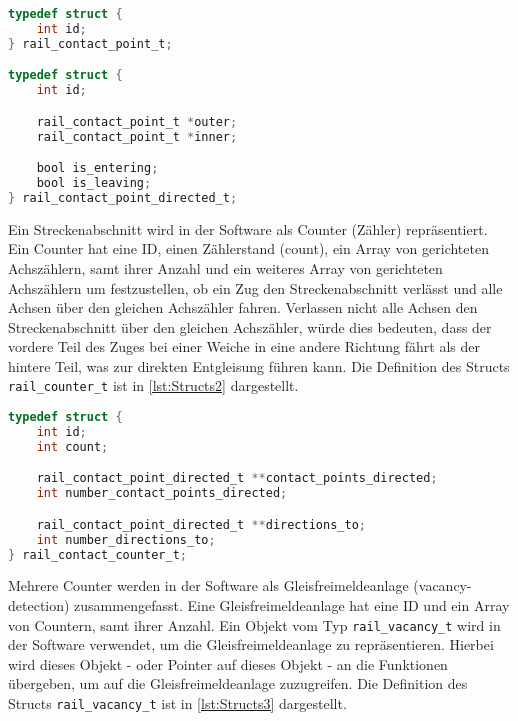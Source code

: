 \begin{margin}
    \begin{lstlisting}[language=C, caption={Definition der Structs}, label={code:Entwicklung-der-GFA:Implementierung-der-Gleisfreimeldeanlage:Achszaehler:Definitionen-der-Structs}]
typedef struct {
    int id;
} rail_contact_point_t;

typedef struct {
    int id;

    rail_contact_point_t *outer;
    rail_contact_point_t *inner;

    bool is_entering;
    bool is_leaving;
} rail_contact_point_directed_t;
    \end{lstlisting}
\end{margin}

Ein Streckenabschnitt wird in der Software als Counter (Zähler) repräsentiert. Ein Counter hat eine ID, einen Zählerstand (count), ein Array von gerichteten Achszählern, samt ihrer Anzahl und ein weiteres Array von gerichteten Achszählern um festzustellen, ob ein Zug den Streckenabschnitt verlässt und alle Achsen über den gleichen Achszähler fahren. Verlassen nicht alle Achsen den Streckenabschnitt über den gleichen Achszähler, würde dies bedeuten, dass der vordere Teil des Zuges bei einer Weiche in eine andere Richtung fährt als der hintere Teil, was zur direkten Entgleisung führen kann. Die Definition des Structs \texttt{rail\_counter\_t} ist in \autoref{lst:Structs2} dargestellt.

\begin{margin}
    \begin{lstlisting}[caption={Definition des Structs rail\_counter\_t},label={lst:Structs2},language=C]
typedef struct {
    int id;
    int count;

    rail_contact_point_directed_t **contact_points_directed;
    int number_contact_points_directed;

    rail_contact_point_directed_t **directions_to;
    int number_directions_to;
} rail_contact_counter_t;
    \end{lstlisting}
\end{margin}

Mehrere Counter werden in der Software als Gleisfreimeldeanlage (vacancy-detection) zusammengefasst. Eine Gleisfreimeldeanlage hat eine ID und ein Array von Countern, samt ihrer Anzahl. Ein Objekt vom Typ \texttt{rail\_vacancy\_t} wird in der Software verwendet, um die Gleisfreimeldeanlage zu repräsentieren. Hierbei wird dieses Objekt - oder Pointer auf dieses Objekt - an die Funktionen übergeben, um auf die Gleisfreimeldeanlage zuzugreifen. Die Definition des Structs \texttt{rail\_vacancy\_t} ist in \autoref{lst:Structs3} dargestellt.

